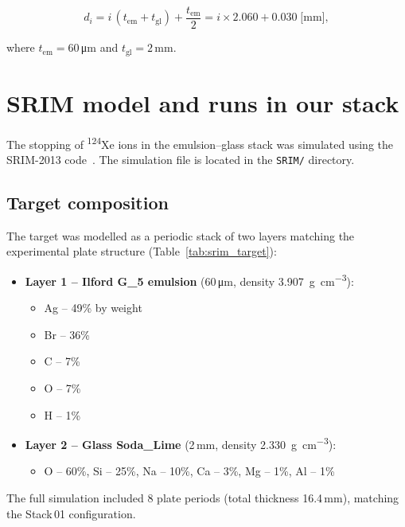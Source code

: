 \documentclass[12pt,a4paper]{article}
\begin{document}
\[
d_i = i\,(t_{\text{em}} + t_{\text{gl}}) + \frac{t_{\text{em}}}{2}
     = i \times 2.060 + 0.030 \;\text{[mm]},
\]

where $t_{\text{em}} = 60$\,\si{\micro\meter} and
$t_{\text{gl}} = 2$\,mm.

\section{SRIM model and runs in our stack}
\label{sec:srim}

The stopping of \textsuperscript{124}Xe ions in the emulsion--glass
stack was simulated using the SRIM-2013 code~\cite{srim2008}. The
simulation file is located in the \texttt{SRIM/} directory.

\subsection{Target composition}

The target was modelled as a periodic stack of two layers matching the
experimental plate structure (Table~\ref{tab:srim_target}):

\begin{itemize}
  \item \textbf{Layer 1 -- Ilford G\_5 emulsion} (60\,\si{\micro\meter},
        density \SI{3.907}{\g\per\cm\cubed}):
        \begin{itemize}
          \item Ag -- 49\% by weight
          \item Br -- 36\%
          \item C -- 7\%
          \item O -- 7\%
          \item H -- 1\%
        \end{itemize}
  \item \textbf{Layer 2 -- Glass Soda\_Lime} (2\,mm,
        density \SI{2.330}{\g\per\cm\cubed}):
        \begin{itemize}
          \item O -- 60\%, Si -- 25\%, Na -- 10\%, Ca -- 3\%,
                Mg -- 1\%, Al -- 1\%
        \end{itemize}
\end{itemize}

The full simulation included 8 plate periods (total thickness
16.4\,mm), matching the Stack\,01 configuration.
\end{document}
